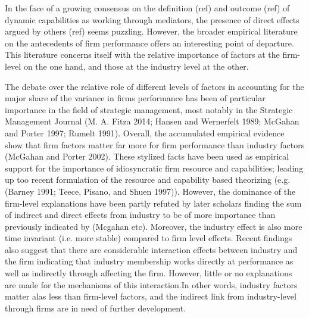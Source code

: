 \documentclass[review,fleqn]{elsarticle}\usepackage[]{graphicx}\usepackage[]{color}
\begin{document}
In the face of a growing consensus on the definition (ref) and outcome (ref) of dynamic
capabilities as working through mediators, the presence of direct effects argued by others
(ref) seems puzzling. However, the broader empirical literature on the antecedents of firm
performance offers an interesting point of departure. This literature concerns itself with
the relative importance of factors at the firm-level on the one hand, and those at the
industry level at the other. 

The debate over the relative role of different levels of factors in accounting for the
major share of the variance in firms performance has been of particular importance in the
field of strategic management, most notably in the Strategic Management Journal
(M. A. Fitza 2014; Hansen and Wernerfelt 1989; McGahan and Porter 1997; Rumelt
1991). Overall, the accumulated empirical evidence show that firm factors matter far more
for firm performance than industry factors (McGahan and Porter 2002). These stylized facts
have been used as empirical support for the importance of idiosyncratic firm resource and
capabilities; leading up too recent formulation of the resource and capability based
theorizing (e.g. (Barney 1991; Teece, Pisano, and Shuen 1997)). However, the dominance of
the firm-level explanations have been partly refuted by later scholars finding the sum of
indirect and direct effects from industry to be of more importance than previously
indicated by (Mcgahan etc). Moreover, the industry effect is also more time invariant
(i.e. more stable) compared to firm level effects. Recent findings also suggest that there
are considerable interaction effects between industry and the firm indicating that
industry membership works directly at performance as well as indirectly through affecting
the firm. However, little or no explanations are made for the mechanisms of this
interaction.In other words, industry factors matter alas less than firm-level factors, and
the indirect link from industry-level through firms are in need of further development.
\end{document}
